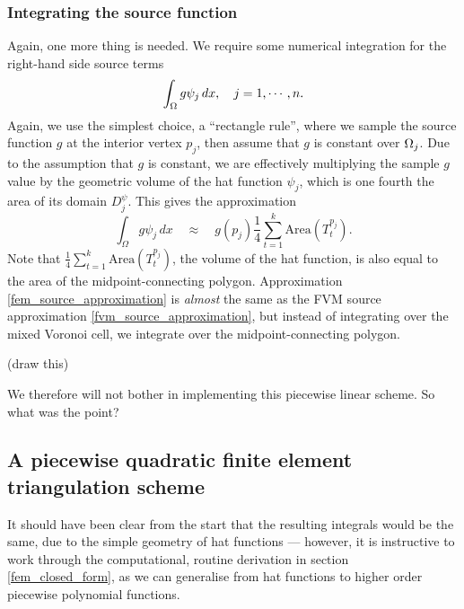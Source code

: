 \subsubsection{Integrating the source function}
Again, one more thing is needed.
We require some numerical integration for the right-hand side source terms
    $$\int_{\Omega}g\psi_j\,dx, \text{\quad $j=1,\cdots,n$}.$$
Again, we use the simplest choice, a ``rectangle rule'', where we sample the source function $g$ at the interior vertex
$p_j$, then assume that $g$ is constant over ${\Omega}_j$.
Due to the assumption that $g$ is constant, we are effectively multiplying the sample $g$ value by the geometric volume of the hat function $\psi_j$,
which is one fourth the area of its domain $D^\psi_j$.
This gives the approximation
\begin{equation}\label{fem_source_approximation}
    \int_{\Omega}g\psi_j\,dx \quad\approx\quad g(p_j)\frac{1}{4}\sum_{t=1}^k\text{Area}(T^{p_j}_t).
\end{equation}
Note that $\frac{1}{4}\sum_{t=1}^k\text{Area}(T^{p_j}_t)$, the volume of the hat function, is also equal to the
area of the midpoint-connecting polygon.
Approximation \eqref{fem_source_approximation} is \textit{almost} the same as the FVM source approximation \eqref{fvm_source_approximation},
but instead of integrating over the mixed Voronoi cell, we integrate over the midpoint-connecting polygon.

\vskip 0.2in
(draw this)
\vskip 0.2in

We therefore will not bother in implementing this piecewise linear scheme.
So what was the point?

\subsection{A piecewise quadratic finite element triangulation scheme}
It should have been clear from the start that the resulting integrals would be the same, due to the simple geometry
of hat functions --- however, it is instructive to work through
the computational, routine derivation in section \ref{fem_closed_form}, as we can generalise from hat functions to higher order piecewise polynomial functions.

